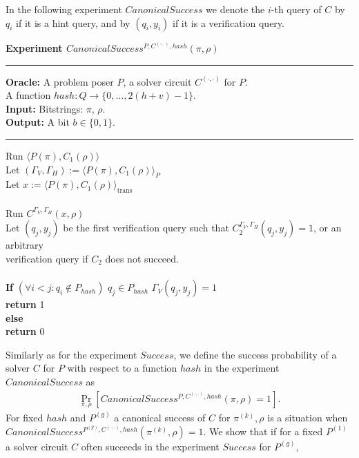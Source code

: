 In the following experiment $CanonicalSuccess$ we denote the $i$-th query of $C$ by $q_i$ if it is a hint query, and by $(q_i, y_i)$
if it is a verification query.
%
\begin{codeblock}
  \textbf{Experiment $CanonicalSuccess^{P, C^{(\cdot, \cdot)}, hash}(\pi, \rho)$}
  \medskip

  \hrule

  \medskip
  \textbf{Oracle:} A problem poser $P$, a solver circuit $C^{(\cdot, \cdot)}$ for $P$.\\
  \IndII A function $hash: Q \rightarrow \{0, \dots, 2(h+v) - 1\}$.\\
  \textbf{Input:}  Bitstrings: $\pi$, $\rho$. \\
  \textbf{Output:} A bit $b \in \{0,1\}$.

  \medskip\hrule\medskip
  Run $\langle P(\pi), C_1(\rho) \rangle$ \\
  \IndI Let $(\Gamma_V, \Gamma_H) := \langle P(\pi), C_1(\rho) \rangle_{P}$ \\
  \IndI Let $x := \langle P(\pi), C_1(\rho) \rangle_{\text{trans}}$ \\ \\
  Run $C^{\Gamma_V, \Gamma_H} (x, \rho)$ \\
  \IndI Let $(q_j,y_j)$ be the first verification query such that $C_2^{\Gamma_V, \Gamma_H}(q_j, y_j) = 1$, or an arbitrary\\
  \IndI verification query if $C_2$ does not succeed.\\
  \\
  \textbf{If} $(\forall i < j :  q_i \notin P_{hash} )$ \And $q_j \in P_{hash}$ \And $\Gamma_V(q_j, y_j) = 1$ \then \\
  \IndI \textbf{return} 1\\
  \textbf{else}\\
  \IndI \textbf{return} 0
\end{codeblock}
%
Similarly as for the experiment $Success$, we define the success probability of a solver $C$ for $P$ with respect to a function $hash$
in the experiment $CanonicalSuccess$ as
%
\begin{align}
 \underset{\pi, \rho}{\Pr}[CanonicalSuccess^{P,C^{(\cdot, \cdot)},hash}(\pi, \rho) = 1].
\end{align}
%
For fixed $hash$ and $P^{(g)}$ a canonical success of $C$ for $\pi^{(k )}, \rho$ is a situation when \\ $CanonicalSuccess^{P^{(g)}, C^{(\cdot, \cdot)}, hash}(\pi^{(k)}, \rho) = 1$.
We show that if for a fixed $P^{(1)}$ a solver circuit $C$ often succeeds in the experiment $Success$ for $P^{(g)}$,

